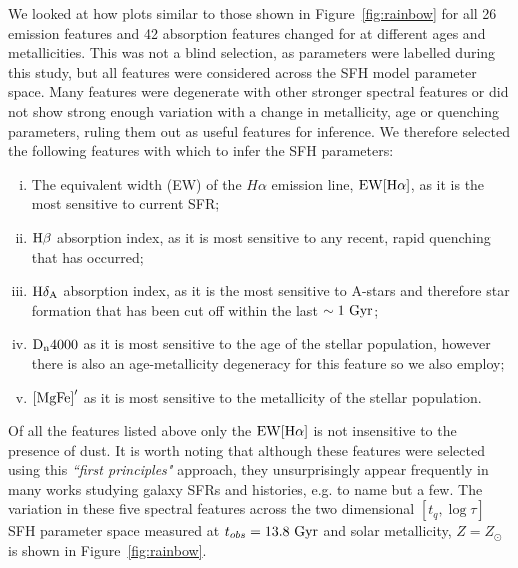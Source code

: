 \documentclass[useAMS,usenatbib]{mn2e}
\begin{document}
We looked at how plots similar to those shown in Figure~\ref{fig:rainbow} for all 26 emission features and 42 absorption features changed for at different ages and metallicities. This was not a blind selection, as parameters were labelled during this study, but all features were considered across the SFH model parameter space. Many features were degenerate with other stronger spectral features or did not show strong enough variation with a change in metallicity, age or quenching parameters, ruling them out as useful features for inference. We therefore selected the following features with which to infer the SFH parameters:
\begin{enumerate}[(i)]
\item The equivalent width (EW) of the $H\alpha$ emission line, $\rm{EW}[H\alpha]$, as it is the most sensitive to current SFR;


\item $\rm{H}\beta$ absorption index, as it is most sensitive to any recent, rapid quenching that has occurred;

\item $\rm{H}\delta_A$ absorption index, as it is the most sensitive to A-stars and therefore star formation that has been cut off within the last $\sim1~\rm{Gyr}$;

\item $\rm{D}_n4000$ as it is most sensitive to the age of the stellar population, however there is also an age-metallicity degeneracy for this feature so we also employ;

\item $\rm{[MgFe]}^{\prime}$ as it is most sensitive to the metallicity of the stellar population.

\end{enumerate}

Of all the features listed above only the $\rm{EW}[H\alpha]$ is not insensitive to the presence of dust. It is worth noting that although these features were selected using this \emph{``first principles"} approach, they unsurprisingly appear frequently in many works studying galaxy SFRs and histories, e.g. \cite{kauffmann03, brinchmann04, goto05b, moustakas06, martin07, huang13, spindler18} to name but a few. The variation in these five spectral features across the two dimensional $[t_q, \log \tau]$ SFH parameter space measured at $t_{obs}=13.8~\rm{Gyr}$ and solar metallicity, $Z=Z_{\odot}$ is shown in Figure~\ref{fig:rainbow}.
\end{document}
